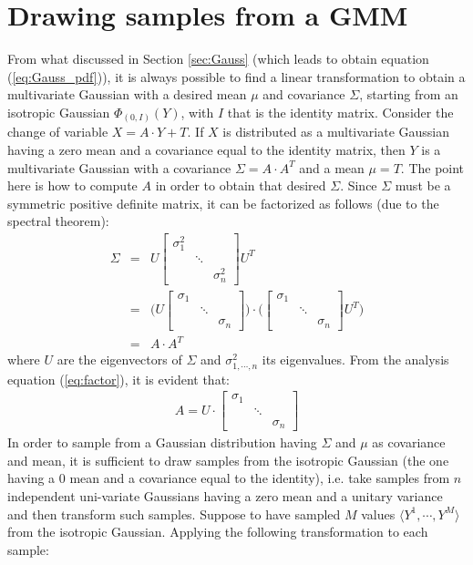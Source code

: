 \documentclass{article}
\begin{document}
\section{Drawing samples from a GMM}
\label{sec:sample}

From what discussed in Section \ref{sec:Gauss} (which leads to obtain equation (\ref{eq:Gauss_pdf})), it is always possible to find a linear transformation to obtain a multivariate Gaussian with a desired mean $\mu$ and covariance $\Sigma$, starting from an isotropic Gaussian $\Phi_{(0,I)}(Y)$, with $I$ that is the identity matrix. Consider the change of variable $X = A \cdot Y + T$. If $X$ is distributed as a multivariate Gaussian having a zero mean and a covariance equal to the identity matrix, then $Y$ is a multivariate Gaussian with a covariance $\Sigma = A \cdot A^T$ and a mean $\mu = T$.
The point here is how to compute $A$ in order to obtain that desired $\Sigma$. 
Since $\Sigma$ must be a symmetric positive definite matrix, it can be factorized as follows (due to the spectral theorem):
\begin{eqnarray}
\Sigma &=& U \begin{bmatrix}
\sigma^2_1 &  & \\ 
 & \ddots & \\ 
 &  & \sigma^2_n
\end{bmatrix} U^T \\
&=& \bigg( U \begin{bmatrix}
\sigma_1 &  & \\ 
 & \ddots & \\ 
 &  & \sigma_n
\end{bmatrix} \bigg) \cdot \bigg( \begin{bmatrix}
\sigma_1 &  & \\ 
 & \ddots & \\ 
 &  & \sigma_n
\end{bmatrix}  U^T \bigg) \\
&=& A \cdot A^T
\label{eq:factor}
\end{eqnarray}
where $U$ are the eigenvectors of $\Sigma$ and $\sigma^2_{1,\cdots,n}$ its eigenvalues. From the analysis equation (\ref{eq:factor}), it is evident that:
\begin{eqnarray}
A = U \cdot  \begin{bmatrix}
\sigma_1 &  & \\ 
 & \ddots & \\ 
 &  & \sigma_n 
\end{bmatrix} 
\end{eqnarray}
In order to sample from a Gaussian distribution having $\Sigma$ and $\mu$ as covariance and mean, it is sufficient to draw samples from the isotropic Gaussian (the one having a 0 mean and a covariance equal to the identity), i.e. take samples from $n$ independent uni-variate Gaussians having a zero mean and a unitary variance and then transform such samples. Suppose to have sampled $M$ values $\langle Y^1, \cdots , Y^M \rangle$ from the isotropic Gaussian. Applying the following transformation to each sample:
\end{document}
